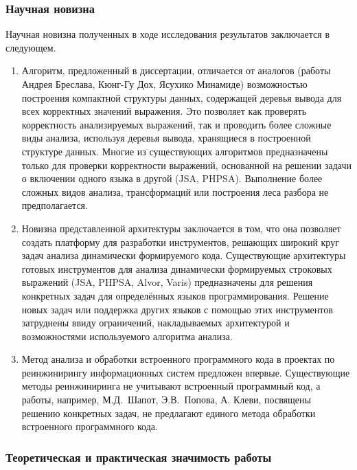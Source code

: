 \subsubsection*{\large{Научная новизна}}

Научная новизна полученных в ходе исследования результатов заключается в следующем.

\begin{enumerate}

\item Алгоритм, предложенный в диссертации, отличается от аналогов (работы Андрея Бреслава, Кюнг-Гу Дох, Ясухико Минамиде) возможностью построения компактной структуры данных, 
содержащей деревья вывода для всех корректных значений выражения. Это позволяет как проверять корректность анализируемых выражений, так и проводить более сложные виды анализа, используя деревья вывода, 
хранящиеся в построенной структуре данных. Многие из существующих алгоритмов предназначены только для проверки корректности 
выражений, основанной на решении задачи о включении одного языка в другой (JSA, PHPSA). Выполнение более сложных видов анализа, трансформаций или построения леса разбора не предполагается. 

\item Новизна представленной архитектуры заключается в том, что она позволяет создать платформу для разработки инструментов, решающих широкий круг задач анализа динамически формируемого кода. Существующие архитектуры готовых инструментов для анализа динамически формируемых строковых выражений (JSA, PHPSA, Alvor, Varis) предназначены для решения конкретных задач для определённых языков программирования. Решение новых задач или поддержка других языков с помощью этих инструментов затруднены ввиду ограничений, накладываемых архитектурой и возможностями используемого алгоритма анализа. 

\item Метод анализа и обработки встроенного программного кода в проектах по реинжинирингу информационных систем предложен впервые. Существующие методы реинжиниринга не учитывают встроенный программный код, а работы, например, М.Д.~Шапот, Э.В.~Попова, А. Клеви, посвящены решению конкретных задач, не предлагают единого метода обработки встроенного программного кода.

\end{enumerate}

\subsubsection*{\large{Теоретическая и практическая значимость работы}}

